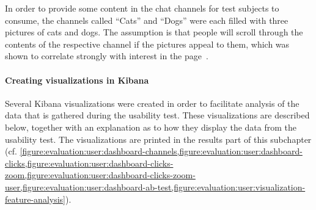 In order to provide some content in the chat channels for test subjects to consume, the channels called ``Cats'' and ``Dogs'' were each filled with three pictures of cats and dogs.
The assumption is that people will scroll through the contents of the respective channel if the pictures appeal to them, which was shown to correlate strongly with interest in the page~\cite{Claypool2001}.

\paragraph{Creating visualizations in Kibana}

Several Kibana visualizations were created in order to facilitate analysis of the data that is gathered during the usability test.
These visualizations are described below, together with an explanation as to how they display the data from the usability test.
The visualizations are printed in the results part of this subchapter (cf. \cref{figure:evaluation:user:dashboard-channels,figure:evaluation:user:dashboard-clicks,figure:evaluation:user:dashboard-clicks-zoom,figure:evaluation:user:dashboard-clicks-zoom-user,figure:evaluation:user:dashboard-ab-test,figure:evaluation:user:visualization-feature-analysis}).

